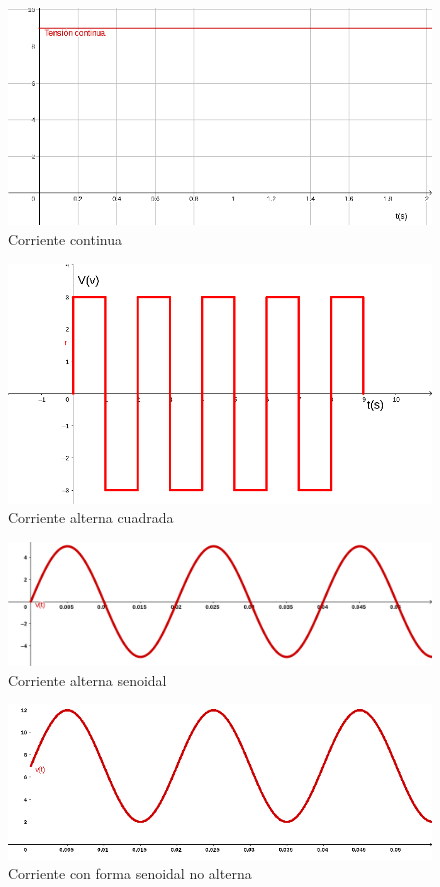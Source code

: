\begin{figure}[htbp]
  \includegraphics[scale=0.75]{images/acdc_a}
  \caption{Corriente continua}
  \label{fig:acdc_a}
\end{figure}
\begin{figure}[htbp]
  \includegraphics[scale=0.6]{images/acdc_b}
  \caption{Corriente alterna cuadrada}
  \label{fig:acdc_b}
\end{figure}
\begin{figure}[htbp]
  \includegraphics[scale=0.14]{images/acdc_c}
  \caption{Corriente alterna senoidal}
  \label{fig:acdc_c}
\end{figure}
\begin{figure}[htbp]
  \includegraphics[scale=0.6]{images/acdc_d}
  \caption{Corriente con forma senoidal no alterna}
  \label{fig:acdc_d}
\end{figure}
